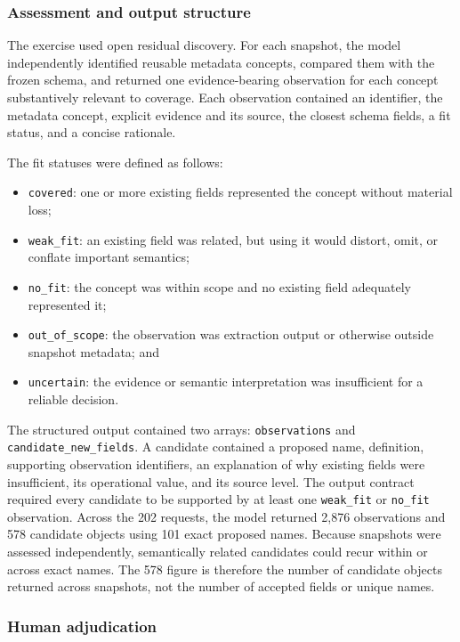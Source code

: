 \documentclass{article}
\begin{document}
\subsubsection{Assessment and output structure}

The exercise used open residual discovery. For each snapshot, the model independently identified reusable metadata concepts, compared them with the frozen schema, and returned one evidence-bearing observation for each concept substantively relevant to coverage. Each observation contained an identifier, the metadata concept, explicit evidence and its source, the closest schema fields, a fit status, and a concise rationale.

The fit statuses were defined as follows:

\begin{itemize}
    \item \texttt{covered}: one or more existing fields represented the concept without material loss;
    \item \texttt{weak\_fit}: an existing field was related, but using it would distort, omit, or conflate important semantics;
    \item \texttt{no\_fit}: the concept was within scope and no existing field adequately represented it;
    \item \texttt{out\_of\_scope}: the observation was extraction output or otherwise outside snapshot metadata; and
    \item \texttt{uncertain}: the evidence or semantic interpretation was insufficient for a reliable decision.
\end{itemize}

The structured output contained two arrays: \texttt{observations} and \texttt{candidate\_new\_fields}. A candidate contained a proposed name, definition, supporting observation identifiers, an explanation of why existing fields were insufficient, its operational value, and its source level. The output contract required every candidate to be supported by at least one \texttt{weak\_fit} or \texttt{no\_fit} observation. Across the 202 requests, the model returned 2,876 observations and 578 candidate objects using 101 exact proposed names. Because snapshots were assessed independently, semantically related candidates could recur within or across exact names. The 578 figure is therefore the number of candidate objects returned across snapshots, not the number of accepted fields or unique names.

\subsubsection{Human adjudication}
\end{document}
